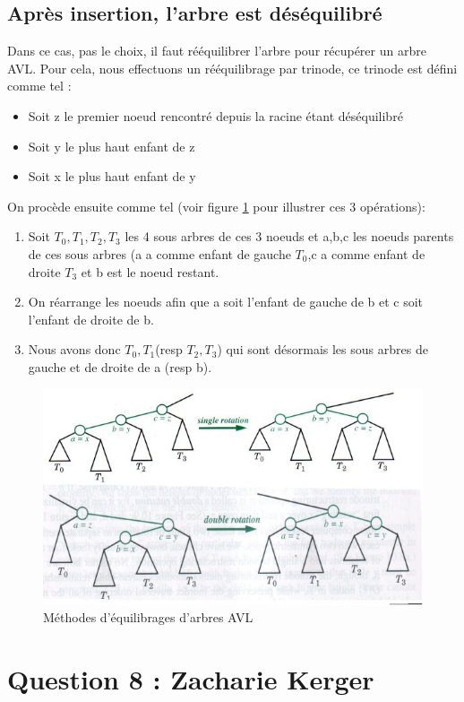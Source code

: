 \documentclass[10pt,a4paper]{article}
\begin{document}
\subsection*{Après insertion, l'arbre est déséquilibré}
Dans ce cas, pas le choix, il faut rééquilibrer l'arbre pour récupérer un arbre AVL. Pour cela, nous effectuons un rééquilibrage par trinode, ce trinode est défini comme tel :
\begin{itemize}
\item Soit z le premier noeud rencontré depuis la racine étant déséquilibré
\item Soit y le plus haut enfant de z
\item Soit x le plus haut enfant de y
\end{itemize}
On procède ensuite comme tel (voir figure \ref{avleq} pour illustrer ces 3 opérations):
\begin{enumerate}

\item Soit $T_0,T_1,T_2,T_3$ les 4 sous arbres de ces 3 noeuds et a,b,c les noeuds parents de ces sous arbres (a a comme enfant de gauche $T_0$,c a comme enfant de droite $T_3$ et b est le noeud restant.
\item On réarrange les noeuds afin que a soit l'enfant de gauche de b et c soit l'enfant de droite de b.
\item Nous avons donc $T_0,T_1$(resp $T_2,T_3$) qui sont désormais les sous arbres de gauche et de droite de a (resp b).
\end{enumerate}
\begin{figure}[!h]
\centering
\includegraphics[scale=0.7]{equilibrage.jpg}
\caption{Méthodes d'équilibrages d'arbres AVL}
\label{avleq}
\end{figure}

\section*{Question 8 : Zacharie Kerger}
\end{document}
